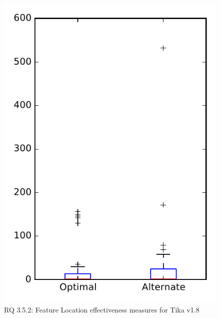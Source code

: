 
\begin{figure}
\centering
\includegraphics[height=0.4\textheight]{figures/combo/flt_rq2_tika}
\caption{RQ 3.5.2: Feature Location effectiveness measures for Tika v1.8}
\label{fig:flt:rq2:tika}
\end{figure}
